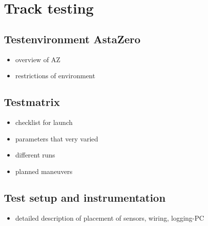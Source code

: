 \documentclass[ExampleMasters.tex]{subfiles}
\begin{document}
\section{Track testing}
\label{sec:track-testing}
\subsection{Testenvironment AstaZero}

\begin{itemize}
	\item overview of AZ
	\item restrictions of environment
	
\end{itemize}

\subsection{Testmatrix}

\begin{itemize}
	\item checklist for launch
	\item parameters that very varied
	\item different runs
	\item planned maneuvers
	
\end{itemize}

\subsection{Test setup and instrumentation}

\begin{itemize}
	\item detailed description of placement of sensors, wiring, logging-PC
\end{itemize}
\end{document}
